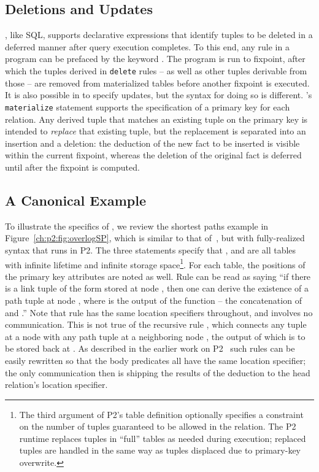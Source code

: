 \subsection{Deletions and Updates}
\OVERLOG, like SQL, supports declarative expressions that identify tuples to be 
deleted in a deferred manner after query execution completes.  To this end, any \OVERLOG rule in a
program can be prefaced by the keyword .  The program is run to fixpoint, after which 
the tuples derived in  {\tt delete} rules -- as well as other tuples derivable from those -- are removed
from materialized tables before another fixpoint is executed. It is also possible in \OVERLOG to specify
updates, but the syntax for doing so is different.  \OVERLOG's {\tt
  materialize} statement supports the specification of a primary key for
each relation.  Any derived tuple that matches an existing tuple on the
primary key is intended to {\em replace} that existing tuple, but
the replacement is separated into an insertion and a deletion: the
deduction of the new fact to be inserted is visible within the current
fixpoint, whereas the deletion of the original fact is deferred until
after the fixpoint is computed.

\subsection{A Canonical Example}
\label{ch:p2:sec:declnet}

To illustrate the specifics of \OVERLOG, we review the shortest
paths example in Figure~\ref{ch:p2:fig:overlogSP}, which is similar to that
of~\cite{loo-sigmod06}, but with fully-realized \OVERLOG syntax that runs
in P2.  The three  statements specify that ,
 and  are all tables with infinite lifetime and
infinite storage space\footnote{The third argument of P2's table
definition optionally specifies a constraint on the number of tuples
guaranteed to be allowed in the relation. The P2 runtime replaces
tuples in ``full'' tables as needed during execution; replaced tuples
are handled in the same way as tuples displaced due to primary-key overwrite.}.  
For each table, the positions of the primary key attributes are noted as well.  
Rule  can be read as saying ``if there is a link tuple of the form  stored 
at node , then one can derive the existence of a path tuple  at node 
, where  is the output of the function  -- the concatenation of 
 and .''  Note that rule  has the same location specifiers throughout, and
involves no communication.  This is not true of the recursive
rule , which connects any  tuple at a node
 with any path tuple at a neighboring node , the
output of which is to be stored back at . As described in
the earlier work on P2~\cite{loo-sigcomm05,loo-sigmod06} such
rules can be easily rewritten so that the body predicates all
have the same location specifier; the only communication then is
shipping the results of the deduction to the head relation's
location specifier. 

